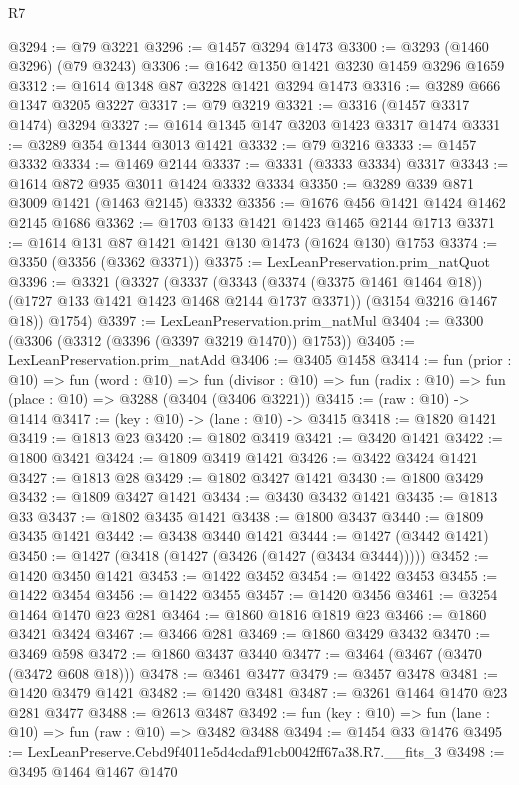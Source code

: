 \begin{lexlean}{R7}
\begin{coremodule}
@3294 := @79 @3221
@3296 := @1457 @3294 @1473
@3300 := @3293 (@1460 @3296) (@79 @3243)
@3306 := @1642 @1350 @1421 @3230 @1459 @3296 @1659
@3312 := @1614 @1348 @87 @3228 @1421 @3294 @1473
@3316 := @3289 @666 @1347 @3205 @3227
@3317 := @79 @3219
@3321 := @3316 (@1457 @3317 @1474) @3294
@3327 := @1614 @1345 @147 @3203 @1423 @3317 @1474
@3331 := @3289 @354 @1344 @3013 @1421
@3332 := @79 @3216
@3333 := @1457 @3332
@3334 := @1469 @2144
@3337 := @3331 (@3333 @3334) @3317
@3343 := @1614 @872 @935 @3011 @1424 @3332 @3334
@3350 := @3289 @339 @871 @3009 @1421 (@1463 @2145) @3332
@3356 := @1676 @456 @1421 @1424 @1462 @2145 @1686
@3362 := @1703 @133 @1421 @1423 @1465 @2144 @1713
@3371 := @1614 @131 @87 @1421 @1421 @130 @1473 (@1624 @130) @1753
@3374 := @3350 (@3356 (@3362 @3371))
@3375 := LexLeanPreservation.prim_natQuot
@3396 := @3321
    (@3327
      (@3337
        (@3343 (@3374 (@3375 @1461 @1464 @18)) (@1727 @133 @1421 @1423 @1468 @2144 @1737 @3371))
        (@3154 @3216 @1467 @18))
      @1754)
@3397 := LexLeanPreservation.prim_natMul
@3404 := @3300 (@3306 (@3312 (@3396 (@3397 @3219 @1470)) @1753))
@3405 := LexLeanPreservation.prim_natAdd
@3406 := @3405 @1458
@3414 := fun (prior : @10) =>
  fun (word : @10) =>
  fun (divisor : @10) => fun (radix : @10) => fun (place : @10) => @3288 (@3404 (@3406 @3221))
@3415 := (raw : @10) -> @1414
@3417 := (key : @10) -> (lane : @10) -> @3415
@3418 := @1820 @1421
@3419 := @1813 @23
@3420 := @1802 @3419
@3421 := @3420 @1421
@3422 := @1800 @3421
@3424 := @1809 @3419 @1421
@3426 := @3422 @3424 @1421
@3427 := @1813 @28
@3429 := @1802 @3427 @1421
@3430 := @1800 @3429
@3432 := @1809 @3427 @1421
@3434 := @3430 @3432 @1421
@3435 := @1813 @33
@3437 := @1802 @3435 @1421
@3438 := @1800 @3437
@3440 := @1809 @3435 @1421
@3442 := @3438 @3440 @1421
@3444 := @1427 (@3442 @1421)
@3450 := @1427 (@3418 (@1427 (@3426 (@1427 (@3434 @3444)))))
@3452 := @1420 @3450 @1421
@3453 := @1422 @3452
@3454 := @1422 @3453
@3455 := @1422 @3454
@3456 := @1422 @3455
@3457 := @1420 @3456
@3461 := @3254 @1464 @1470 @23 @281
@3464 := @1860 @1816 @1819 @23
@3466 := @1860 @3421 @3424
@3467 := @3466 @281
@3469 := @1860 @3429 @3432
@3470 := @3469 @598
@3472 := @1860 @3437 @3440
@3477 := @3464 (@3467 (@3470 (@3472 @608 @18)))
@3478 := @3461 @3477
@3479 := @3457 @3478
@3481 := @1420 @3479 @1421
@3482 := @1420 @3481
@3487 := @3261 @1464 @1470 @23 @281 @3477
@3488 := @2613 @3487
@3492 := fun (key : @10) => fun (lane : @10) => fun (raw : @10) => @3482 @3488
@3494 := @1454 @33 @1476
@3495 := LexLeanPreserve.Cebd9f4011e5d4cdaf91cb0042ff67a38.R7.__fits_3
@3498 := @3495 @1464 @1467 @1470

\end{coremodule}
\end{lexlean}
